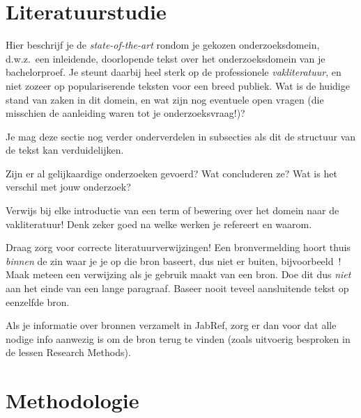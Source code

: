 \documentclass{hogent-article}
\begin{document}
\section{Literatuurstudie}%
\label{sec:literatuurstudie}


Hier beschrijf je de \emph{state-of-the-art} rondom je gekozen onderzoeksdomein, d.w.z.\ een inleidende, doorlopende tekst over het onderzoeksdomein van je bachelorproef. Je steunt daarbij heel sterk op de professionele \emph{vakliteratuur}, en niet zozeer op populariserende teksten voor een breed publiek. Wat is de huidige stand van zaken in dit domein, en wat zijn nog eventuele open vragen (die misschien de aanleiding waren tot je onderzoeksvraag!)? 

Je mag deze sectie nog verder onderverdelen in subsecties als dit de structuur van de tekst kan verduidelijken.

Zijn er al gelijkaardige onderzoeken gevoerd? Wat concluderen ze? Wat is het verschil met jouw onderzoek?

Verwijs bij elke introductie van een term of bewering over het domein naar de vakliteratuur! Denk zeker goed na welke werken je refereert en waarom.

Draag zorg voor correcte literatuurverwijzingen! Een bronvermelding hoort thuis \emph{binnen} de zin waar je je op die bron baseert, dus niet er buiten, bijvoorbeeld~\autocite{Hykes2013}! Maak meteen een verwijzing als je gebruik maakt van een bron. Doe dit dus \emph{niet} aan het einde van een lange paragraaf. Baseer nooit teveel aansluitende tekst op eenzelfde bron.

Als je informatie over bronnen verzamelt in JabRef, zorg er dan voor dat alle nodige info aanwezig is om de bron terug te vinden (zoals uitvoerig besproken in de lessen Research Methods).


\section{Methodologie}%
\label{sec:methodologie}

\end{document}
